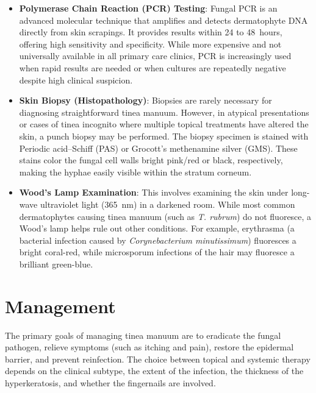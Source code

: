 \begin{itemize}
\begin{itemize}
    \end{itemize}
    \item \textbf{Polymerase Chain Reaction (PCR) Testing}: Fungal PCR is an advanced molecular technique that amplifies and detects dermatophyte DNA directly from skin scrapings. It provides results within 24 to 48~hours, offering high sensitivity and specificity. While more expensive and not universally available in all primary care clinics, PCR is increasingly used when rapid results are needed or when cultures are repeatedly negative despite high clinical suspicion.
    \item \textbf{Skin Biopsy (Histopathology)}: Biopsies are rarely necessary for diagnosing straightforward tinea manuum. However, in atypical presentations or cases of tinea incognito where multiple topical treatments have altered the skin, a punch biopsy may be performed. The biopsy specimen is stained with Periodic acid--Schiff (PAS) or Grocott's methenamine silver (GMS). These stains color the fungal cell walls bright pink/red or black, respectively, making the hyphae easily visible within the stratum corneum.
    \item \textbf{Wood's Lamp Examination}: This involves examining the skin under long-wave ultraviolet light (365~nm) in a darkened room. While most common dermatophytes causing tinea manuum (such as \textit{T. rubrum}) do not fluoresce, a Wood's lamp helps rule out other conditions. For example, erythrasma (a bacterial infection caused by \textit{Corynebacterium minutissimum}) fluoresces a bright coral-red, while microsporum infections of the hair may fluoresce a brilliant green-blue.
\end{itemize}

\section*{Management}
The primary goals of managing tinea manuum are to eradicate the fungal pathogen, relieve symptoms (such as itching and pain), restore the epidermal barrier, and prevent reinfection. The choice between topical and systemic therapy depends on the clinical subtype, the extent of the infection, the thickness of the hyperkeratosis, and whether the fingernails are involved.


